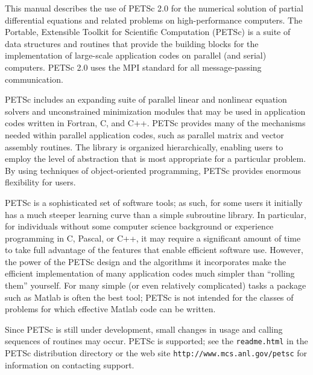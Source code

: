 
%
%

\medskip \medskip
This manual describes the use of PETSc 2.0 for the numerical solution
of partial differential equations and related problems 
on high-performance computers.  The
Portable, Extensible Toolkit for Scientific Computation (PETSc) is a
suite of data structures and routines that provide the building
blocks for the implementation of large-scale application codes on parallel
(and serial) computers.  PETSc 2.0 uses the MPI standard for all
message-passing communication.

PETSc includes an expanding suite of parallel linear and nonlinear
equation solvers and unconstrained minimization modules that may be
used in application codes written in Fortran, C, and C++.  PETSc
provides many of the mechanisms needed within parallel application
codes, such as parallel matrix and vector assembly routines. The library is
organized hierarchically, enabling users to employ the level of
abstraction that is most appropriate for a particular problem. By
using techniques of object-oriented programming, PETSc provides
enormous flexibility for users.

PETSc is a sophisticated set of software tools; as such, for some
users it initially has a much steeper learning curve than a
simple subroutine library. In particular, for individuals without some
computer science background or experience programming in C,
Pascal, or C++, it may require a significant amount of time to take full
advantage of the features that enable efficient software use.
However, the power of the PETSc design and
the algorithms it incorporates make the efficient implementation of
many application codes much simpler than ``rolling them'' yourself.
For many simple (or even relatively complicated) tasks a package such as
Matlab is often the best tool; PETSc is not intended for the classes
of problems for which effective Matlab code can be written.

Since PETSc is still under development, small changes in usage and
calling sequences of routines may occur.  PETSc is supported; see the
{\tt readme.html} in the PETSc distribution directory or the web site
{\tt http://www.mcs.anl.gov/petsc} for information on contacting support.

\medskip \medskip


\medskip

